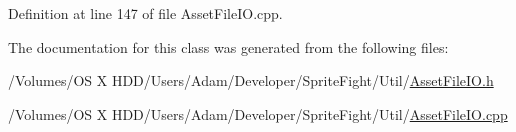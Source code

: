 Definition at line 147 of file Asset\-File\-I\-O.\-cpp.



The documentation for this class was generated from the following files\-:\begin{DoxyCompactItemize}
\item 
/\-Volumes/\-O\-S X H\-D\-D/\-Users/\-Adam/\-Developer/\-Sprite\-Fight/\-Util/\hyperlink{_asset_file_i_o_8h}{Asset\-File\-I\-O.\-h}\item 
/\-Volumes/\-O\-S X H\-D\-D/\-Users/\-Adam/\-Developer/\-Sprite\-Fight/\-Util/\hyperlink{_asset_file_i_o_8cpp}{Asset\-File\-I\-O.\-cpp}\end{DoxyCompactItemize}

